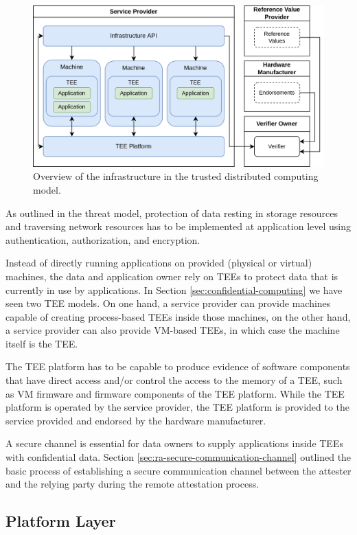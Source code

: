 \begin{figure}[H]
  \centering
  \includegraphics[width=0.9\linewidth]{resources/untrusted-infrastructure-architecture.drawio.png}
  \caption{Overview of the infrastructure in the trusted distributed computing model.}
  \label{fig:untrusted-architecture-overview}
\end{figure}

As outlined in the threat model, protection of data resting in storage resources
and traversing network resources has to be implemented at application level
using authentication, authorization, and encryption.

Instead of directly running applications on provided (physical or virtual)
machines, the data and application owner rely on TEEs to protect data that is
currently in use by applications. In Section \ref{sec:confidential-computing} we
have seen two TEE models. On one hand, a service provider can provide machines
capable of creating process-based TEEs inside those machines, on the other hand,
a service provider can also provide VM-based TEEs, in which case the machine
itself is the TEE.

The TEE platform has to be capable to produce evidence of software components
that have direct access and/or control the access to the memory of a TEE, such
as VM firmware and firmware components of the TEE platform. While the TEE
platform is operated by the service provider, the TEE platform is provided to
the service provided and endorsed by the hardware manufacturer.

A secure channel is essential for data owners to supply applications inside TEEs
with confidential data. Section \ref{sec:ra-secure-communication-channel}
outlined the basic process of establishing a secure communication channel
between the attester and the relying party during the remote attestation
process.

\subsection{Platform Layer}

